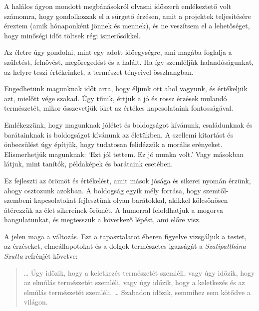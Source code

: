 A halálos ágyon mondott megbánásokról olvasni időszerű emlékeztető volt
számomra, hogy gondolkozzak el a sürgető érzésen, amit a projektek
teljesítésére éreztem (amik hónaponként jönnek és mennek), és ne
veszítsem el a lehetőséget, hogy minőségi időt töltsek régi
ismerősökkel.

\enlargethispage*{\baselineskip}

Az életre úgy gondolni, mint egy adott időegységre, ami magába foglalja
a születést, felnövést, megöregedést és a halált. Ha így szemléljük
halandóságunkat, az helyre teszi értékeinket, a természet tényeivel
összhangban.

Engedhetünk magunknak időt arra, hogy éljünk ott ahol vagyunk, és
értékeljük azt, mielőtt vége szakad. Úgy tűnik, értjük a jó és rossz
érzések mulandó természetét, mikor összevetjük őket az értékes
kapcsolataink fontosságával.

Emlékezzünk, hogy magunknak jólétet és boldogságot kívánunk,
családunknak és barátainknak is boldogságot kívánunk az életükben. A
szellemi kitartást és önbecsülést úgy építjük, hogy tudatosan felidézzük
a morális erényeket. Elismerhetjük magunknak: `Ezt jól tettem. Ez jó
munka volt.' Vagy másokban látjuk, mint tanítók, példaképek és barátaink
esetében.

Ez fejleszti az örömöt és értékelést, amit mások jósága és sikerei
nyomán érzünk, ahogy osztozunk azokban. A boldogság egyik mély forrása,
hogy szemtől-szembeni kapcsolatokat fejlesztünk olyan barátokkal,
akikkel kölcsönösen átérezzük az élet sikereinek örömét. A humorral
feloldhatjuk a mogorva hangulatunkat, és megtesszük a következő lépést,
ami előre visz.

\enlargethispage*{\baselineskip}

A jelen maga a változás. Ezt a tapasztalatot éberen figyelve vizsgáljuk
a testet, az érzéseket, elmeállapotokat és a dolgok természetes
igazságát a \emph{Szatipatthána Szutta} refrénjét követve:

\begin{quote}
\ldots{} Úgy időzik, hogy a keletkezés természetét szemléli, vagy úgy
időzik, hogy az elmúlás természetét szemléli, vagy úgy időzik, hogy a
keletkezés és az elmúlás természetét szemléli. \ldots{} Szabadon időzik,
semmihez sem kötődve a világon.

\bigskip

\end{quote}
